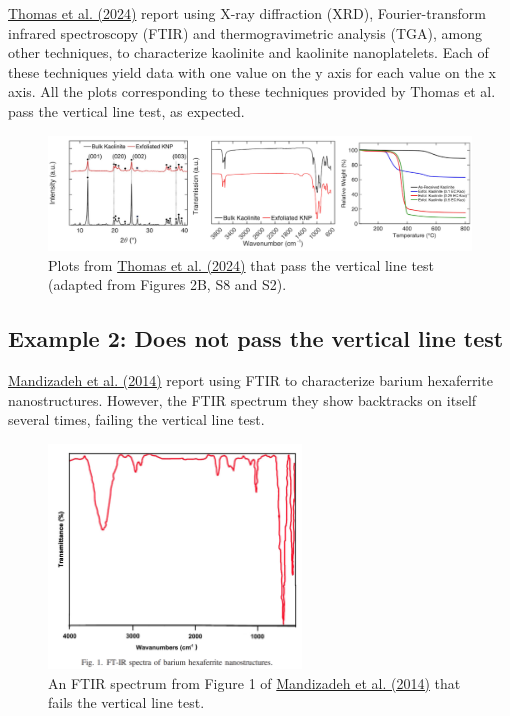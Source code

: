 \documentclass[letterpaper, 12pt]{article}
\begin{document}
\href{https://doi.org/10.1021/acsami.4c03997}{Thomas et al. (2024)} report using X-ray diffraction (XRD), Fourier-transform infrared spectroscopy (FTIR) and thermogravimetric analysis (TGA), among other techniques, to characterize kaolinite and kaolinite nanoplatelets. Each of these techniques yield data with one value on the y axis for each value on the x axis. All the plots corresponding to these techniques provided by Thomas et al. pass the vertical line test, as expected.

\begin{figure}[h!tbp]
    \centering
    \includegraphics[width=\textwidth]{img/vertical_line/thomas_et_al_mockup.png}
    \caption*{Plots from \href{https://doi.org/10.1021/acsami.4c03997}{Thomas et al. (2024)} that pass the vertical line test (adapted from Figures 2B, S8 and S2).}
\end{figure}

\subsection*{Example 2: Does not pass the vertical line test}

\href{https://doi.org/10.1016/j.ceramint.2014.07.091}{Mandizadeh et al. (2014)} report using FTIR to characterize barium hexaferrite nanostructures. However, the FTIR spectrum they show backtracks on itself several times, failing the vertical line test.

\begin{figure}[h!tbp]
    \centering
    \includegraphics[width=0.6\textwidth]{img/vertical_line/mandizaeh_ftir.png}
    \caption*{An FTIR spectrum from Figure 1 of \href{https://doi.org/10.1016/j.ceramint.2014.07.091}{Mandizadeh et al. (2014)} that fails the vertical line test.}
\end{figure}
\end{document}
